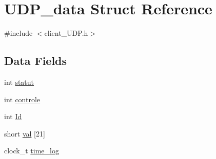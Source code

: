 \hypertarget{struct_u_d_p__data}{\section{U\-D\-P\-\_\-data Struct Reference}
\label{struct_u_d_p__data}
}


{\ttfamily \#include $<$client\-\_\-\-U\-D\-P.\-h$>$}

\subsection*{Data Fields}
\begin{DoxyCompactItemize}
\item 
int \hyperlink{struct_u_d_p__data_ae6fda912a1fbaaf454b35f51919e824a}{statut}
\item 
int \hyperlink{struct_u_d_p__data_a7d35c5e34b4e8dc38e1d4ad1fadbfd08}{controle}
\item 
int \hyperlink{struct_u_d_p__data_afe0b47b3c92f2f69ea3da50cb72553eb}{Id}
\item 
short \hyperlink{struct_u_d_p__data_a6549447b79ab965663c733c54fde16a6}{val} \mbox{[}21\mbox{]}
\item 
clock\-\_\-t \hyperlink{struct_u_d_p__data_a3a0cad28322d56489bce6f3841dadc10}{time\-\_\-log}
\end{DoxyCompactItemize}


